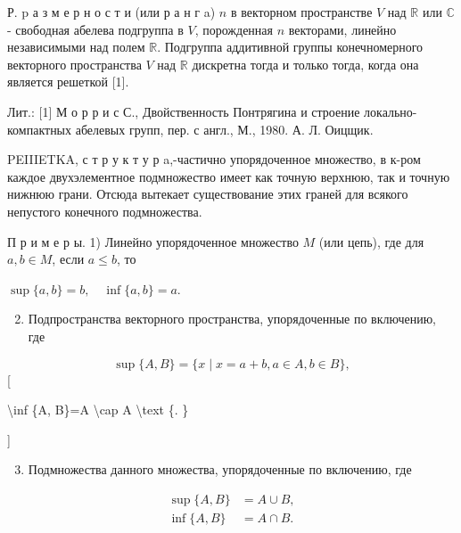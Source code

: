 \documentclass[10pt]{article}
\begin{document}
Р. $\mathrm{p}$ а з м е р н о с т и (или р а н $г$ a) $n$ в векторном пространстве $V$ над $\mathbb{R}$ или $\mathbb{C}$ - свободная абелева подгруппа в $V$, порожденная $n$ векторами, линейно независимыми над полем $\mathbb{R}$. Подгруппа аддитивной группы конечномерного векторного пространства $V$ над $\mathbb{R}$ дискретна тогда и только тогда, когда она является решеткой [1].



Лит.: [1] М о р р и с С., Двойственность Понтрягина и строение локально-компактных абелевых групп, пер. с англ., М., 1980. А. Л. Оицщик.



PEIIIETKA, с т р у к т у р a,-частично упорядоченное множество, в к-ром каждое двухэлементное подмножество имеет как точную верхнюю, так и точную нижнюю грани. Отсюда вытекает существование этих граней для всякого непустого конечного подмножества.



П р и м е р ы. 1) Линейно упорядоченное множество $M$ (или цепь), где для $a, b \in M$, если $a \leqslant b$, то



$\sup \{a, b\}=b, \quad \inf \{a, b\}=a$.



\begin{enumerate}

  \setcounter{enumi}{1}

  \item Подпространства векторного пространства, упорядоченные по включению, где

\end{enumerate}



\[

\sup \{A, B\}=\{x \mid x=a+b, a \in A, b \in B\},

\][



\textbackslash inf \{A, B\}=A \textbackslash cap A \textbackslash text \{. \}

]



\begin{enumerate}

  \setcounter{enumi}{2}

  \item Подмножества данного множества, упорядоченные по включению, где

\end{enumerate}



\[

\begin{aligned}

\sup \{A, B\} & =A \cup B, \\

\inf \{A, B\} & =A \cap B .

\end{aligned}

\]
\end{document}
